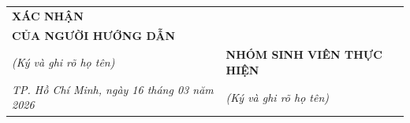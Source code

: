 \documentclass{article}[13pt]
\begin{document}
    \pagebreak
    
    
    \nocite{*}

    \begin{table}[h]
    \centering
        \begin{tabular}{p{7cm}p{7cm}}
        \textbf{XÁC NHẬN}\\
        \textbf{CỦA NGƯỜI HƯỚNG DẪN}\\
        \textit{(Ký và ghi rõ họ tên)} & \textbf{NHÓM SINH VIÊN THỰC HIỆN}\\
        \textit{TP. Hồ Chí Minh, ngày 16 tháng 03 năm 2026} & \textit{(Ký và ghi rõ họ tên)}
        \end{tabular}
    \end{table}
\end{document}

